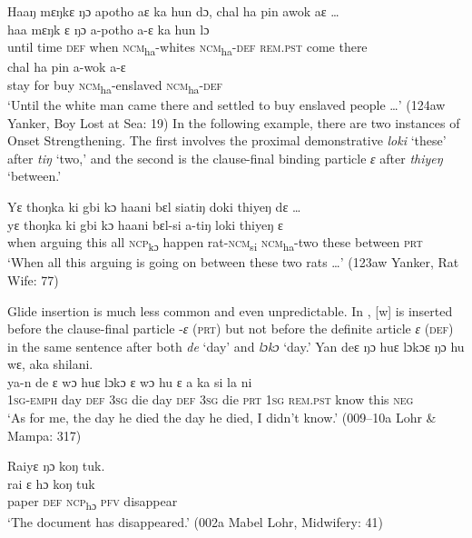 \ea%
\label{ex:42}
Haaŋ mɛŋkɛ ŋɔ apotho aɛ ka hun  dɔ, chal ha pin awok aɛ …\\
\gll haa  mɛŋk    ɛ    ŋɔ      a-potho      a-ɛ        ka      hun  lɔ\\
until  time    \textsc{def}  when    \textsc{ncm}\textsubscript{ha}{}-whites  \textsc{ncm}\textsubscript{ha}{}-\textsc{def}  \textsc{rem.pst}  come  there\\
\gll chal  ha    pin  a-wok      a-ɛ\\
stay  for    buy  \textsc{ncm}\textsubscript{ha}{}-enslaved  \textsc{ncm}\textsubscript{ha}{}-\textsc{def}\\
\glt ‘Until the white man came there and settled to buy enslaved people …' (124aw Yanker, Boy Lost at Sea: 19)
\z
In the following example, there are two instances of Onset Strengthening. The first involves the proximal demonstrative \textit{loki} ‘these' after \textit{tiŋ} ‘two,' and the second is the clause-final binding particle \textit{ɛ} after \textit{thiyeŋ} ‘between.'

\ea%
\label{ex:43}
    Yɛ   thoŋka ki gbi kɔ haani bɛl siatiŋ doki thiyeŋ dɛ …\\
\gll yɛ    thoŋka  ki    gbi  kɔ    haani    bɛl-si      a-tiŋ      loki  thiyeŋ  ɛ\\
when  arguing  this  all    \textsc{ncp}\textsubscript{kɔ}  happen  rat-\textsc{ncm}\textsubscript{si}  \textsc{ncm}\textsubscript{ha}{}-two  these  between  \textsc{prt}\\
\glt ‘When all this arguing is going on between these two rats …' (123aw Yanker, Rat Wife: 77)
\z

Glide insertion is much less common and even unpredictable. In , [w] is inserted before the clause-final particle -\textit{ɛ} (\textsc{prt}) but not before the definite article \textit{ɛ} (\textsc{def}) in the same sentence after both \textit{de} ‘day' and \textit{lɔkɔ} ‘day.'
\clearpage
\ea%
\label{ex:44}
\ea Yan deɛ ŋɔ huɛ lɔkɔɛ ŋɔ hu wɛ, aka shilani.\\
\gll ya-n      de    ɛ    wɔ    huɛ  lɔkɔ  ɛ    wɔ    hu  ɛ    a    ka      si    la    ni\\
\textsc{1sg-emph}  day  \textsc{def}  3\textsc{sg}  die  day  \textsc{def}  \textsc{3sg}  die \textsc{prt}  \textsc{1sg}  \textsc{rem.pst}  know  this  \textsc{neg}\\
\glt ‘As for me, the day he died the day he died, I didn't know.' (009--10a Lohr \& Mampa: 317)

\ex  Raiyɛ ŋɔ koŋ tuk.\\
\gll rai      ɛ    hɔ      koŋ  tuk\\
paper    \textsc{def}  \textsc{ncp}\textsubscript{hɔ}    \textsc{pfv}  disappear\\
\glt ‘The document has disappeared.' (002a Mabel Lohr, Midwifery: 41)
\z
\z

